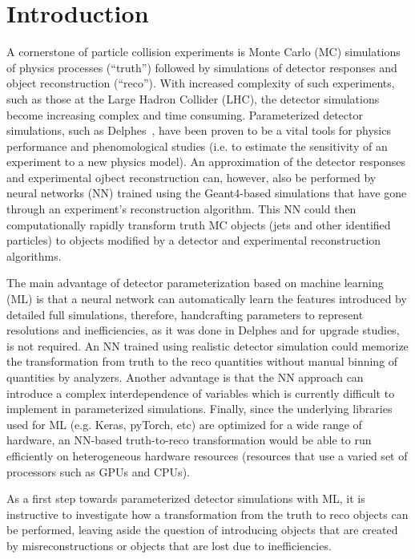 \documentclass[showpacs,showkeys,preprint,prd,nofootinbib,linenumbers,12pt,superscriptaddress]{revtex4-1}
\begin{document}
\maketitle

\section{Introduction}

A cornerstone of particle collision experiments is Monte Carlo (MC) simulations of physics processes (``truth'') followed by simulations of detector responses and object reconstruction (``reco''). With increased complexity of such experiments, such as those at the Large Hadron Collider (LHC), the detector simulations become increasing complex and time consuming. Parameterized detector simulations, such as Delphes~\cite{deFavereau:2013fsa}, have been proven to be a vital tools for physics performance and phenomological studies (i.e. to estimate the sensitivity of an experiment to a new physics model). An approximation of the detector responses and experimental ojbect reconstruction can, however, also be performed by neural networks (NN) trained using the Geant4-based simulations that have gone through an experiment's reconstruction algorithm. This NN could then computationally rapidly transform truth MC objects (jets and other identified particles) to objects modified by a detector and experimental reconstruction algorithms.  

The main advantage of detector parameterization based on machine learning (ML) is that a neural network can automatically learn the features introduced by detailed full simulations, therefore, handcrafting parameters to represent resolutions and inefficiencies, as it was done in Delphes and for upgrade studies, is not required. An NN trained using realistic detector simulation could memorize the transformation from truth to the reco quantities without manual binning of quantities by analyzers. Another advantage is that the NN approach can introduce a complex interdependence of variables which is currently difficult to implement in parameterized simulations. Finally, since the underlying libraries used for ML (e.g. Keras, pyTorch, etc) are optimized for a wide range of hardware, an NN-based truth-to-reco transformation would be able to run efficiently on heterogeneous hardware resources (resources that use a varied set of processors such as GPUs and CPUs).

As a first step towards parameterized detector simulations with ML, it is instructive to investigate how a transformation from the truth to reco objects can be performed, leaving aside the question of introducing objects that are created by misreconstructions or objects that are lost due to inefficiencies.
\end{document}
